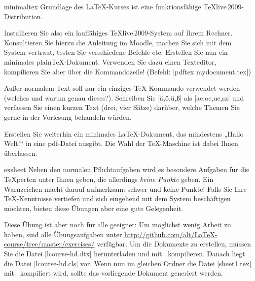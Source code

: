 \documentclass[
	blatt=1,
	ausgabe=16.\,04.\,2010,
	rückgabe=23.\,04.\,2010
]{lcourse-hd}
\begin{document}
\begin{exercise}[name=Minimales \TeX-Dokument,punkte=10,abgabe = Beide Quelltexte per Mail{,} das fertige \TeX-Dokument als Ausdruck.]{minimaltex}
Grundlage des \LaTeX-Kurses ist eine funktionsfähige \TeX live\,2009-Distribution. 

Installieren Sie also ein lauffähiges \TeX live\,2009-System auf Ihrem Rechner. Konsultieren Sie hierzu die Anleitung im Moodle, machen Sie sich mit dem System vertraut, testen Sie verschiedene Befehle etc.
Erstellen Sie nun ein minimales plain\TeX-Dokument. Verwenden Sie dazu einen Texteditor, kompilieren Sie aber über die Kommandozeile! (Befehl: |pdftex mydocument.tex|)

Außer normalem Text soll nur ein einziges \TeX-Kommando verwendet werden (welches und warum genau dieses?). Schreiben Sie |ä,ö,ü,ß| als |ae,oe,ue,sz| und verfassen Sie einen kurzen Text (drei, vier Sätze) darüber, welche Themen Sie gerne in der Vorlesung behandeln würden.

Erstellen Sie weiterhin ein minimales \LaTeX-Dokument, das mindestens „Hallo Welt!“ in eine pdf-Datei ausgibt. Die Wahl der \TeX-Maschine ist dabei Ihnen überlassen.
\end{exercise}

\begin{expertexercise}[
	name=Übungsblätter selbst erstellen,
	abgabe = Keine Abgabe nötig.
]{exsheet}
Neben den normalen Pflichtaufgaben wird es besondere Aufgaben für die \TeX perten unter Ihnen geben, die allerdings \emph{keine Punkte} geben. Ein Warnzeichen macht darauf aufmerksam: schwer und keine Punkte! \raisebox{1ex}{\font\manualtiny=manfnt at 6pt\manualtiny\char127} Falls Sie Ihre \TeX-Kenntnisse vertiefen und sich eingehend mit dem System beschäftigen möchten, bieten diese Übungen aber eine gute Gelegenheit.

Diese Übung ist aber noch für alle geeignet: Um möglichst wenig Arbeit zu haben, sind alle Übungsaufgaben unter \url{http://github.com/alt/LaTeX-course/tree/master/exercises/} verfügbar. Um die Dokumente zu erstellen, müssen Sie die Datei |lcourse-hd.dtx| herunterladen und mit \XeLaTeX\ kompilieren. Danach liegt die Datei |lcourse-hd.cls| vor. Wenn nun im gleichen Ordner die Datei |sheet1.tex| mit \XeLaTeX\ kompiliert wird, sollte das vorliegende Dokument generiert werden.

\end{expertexercise}
\end{document}
